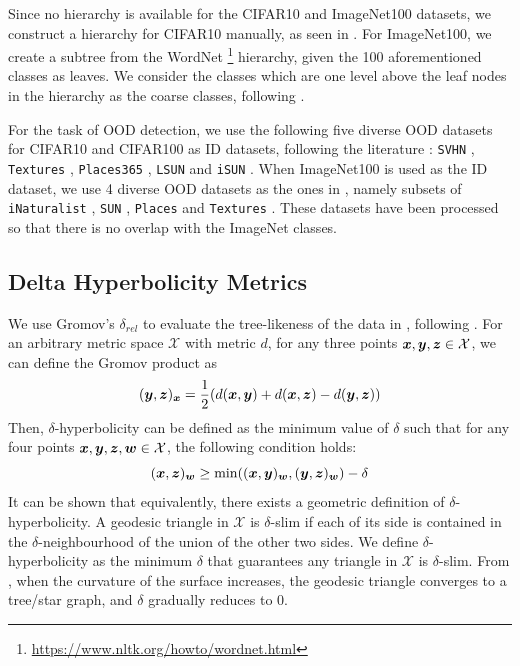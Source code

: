 Since no hierarchy is available for the CIFAR10 and ImageNet100 datasets, we construct a hierarchy for CIFAR10 manually, as seen in . For ImageNet100, we create a subtree from the WordNet \footnote{\href{https://www.nltk.org/howto/wordnet.html}{https://www.nltk.org/howto/wordnet.html}} hierarchy, given the 100 aforementioned classes as leaves. We consider the classes which are one level above the leaf nodes in the hierarchy as the coarse classes, following \citet{zeng2022learning}.

For the task of OOD detection, we use the following five diverse OOD datasets for CIFAR10 and CIFAR100 as ID datasets, following the literature \citep{sun2022knnood}: \texttt{SVHN} \citep{svhn}, \texttt{Textures} \citep{texture}, \texttt{Places365} \citep{zhou2017places}, \texttt{LSUN} \citep{lsun} and \texttt{iSUN} \citep{isun}. When ImageNet100 is used as the ID dataset, we use 4 diverse OOD datasets as the ones in \citep{huang2021mos}, namely subsets of \texttt{iNaturalist} \citep{Horn_2018_CVPR}, \texttt{SUN} \citep{xiao2010sun}, \texttt{Places} \citep{zhou2017places} and \texttt{Textures} \citep{texture}. These datasets have been processed so that there is no overlap with the ImageNet classes. 




\subsection{Delta Hyperbolicity Metrics}
\label{app:sec_delta_hyperbolicity}

We use Gromov's $\delta_{rel}$ to evaluate the tree-likeness of the data in , following \citet{khrulkov2020hyperbolic}. For an arbitrary metric space $\mathcal{X}$ with metric $d$, for any three points ${\bm{x}},{\bm{y}},{\bm{z}} \in \mathcal{X}$, we can define the Gromov product as
\begin{equation*}
    ({\bm{y}},{\bm{z}})_{\bm{x}} = \frac{1}{2}(d({\bm{x}},{\bm{y}}) + d({\bm{x}},{\bm{z}}) - d({\bm{y}},{\bm{z}}))
\end{equation*}
Then, $\delta$-hyperbolicity can be defined as the minimum value of $\delta$ such that for any four points ${\bm{x}}, {\bm{y}}, {\bm{z}}, {\bm{w}} \in \mathcal{X}$, the following condition holds:
\begin{equation*}
    ({\bm{x}},{\bm{z}})_{\bm{w}} \geq \min(({\bm{x}},{\bm{y}})_{\bm{w}},({\bm{y}},{\bm{z}})_{\bm{w}}) - \delta
\end{equation*}
It can be shown that equivalently, there exists a geometric definition of $\delta$-hyperbolicity. A geodesic triangle in $\mathcal{X}$ is $\delta$-slim if each of its side is contained in the $\delta$-neighbourhood of the union of the
other two sides. We define $\delta$-hyperbolicity as the minimum $\delta$ that guarantees any triangle in $\mathcal{X}$ is $\delta$-slim. From , when the curvature of the surface increases, the geodesic triangle converges to a tree/star graph, and $\delta$ gradually reduces to $0$. 

